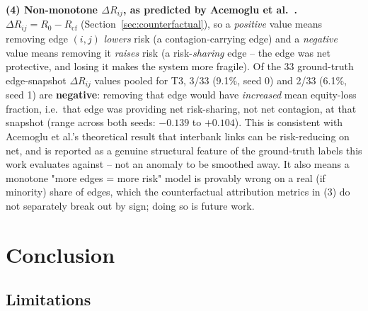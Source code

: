 \documentclass[journal]{IEEEtran}
\begin{document}
\textbf{(4) Non-monotone $\Delta R_{ij}$, as predicted by Acemoglu et
al.\ \cite{acemoglu2015}.} $\Delta R_{ij} = R_0 - R_{\mathrm{cf}}$
(Section~\ref{sec:counterfactual}), so a \emph{positive} value means
removing edge $(i,j)$ \emph{lowers} risk (a contagion-carrying edge) and a
\emph{negative} value means removing it \emph{raises} risk (a
risk-\emph{sharing} edge -- the edge was net protective, and losing it
makes the system more fragile). Of the 33 ground-truth edge-snapshot
$\Delta R_{ij}$ values pooled for T3, 3/33 (9.1\%, seed 0) and 2/33
(6.1\%, seed 1) are \textbf{negative}: removing that edge would have
\emph{increased} mean equity-loss fraction, i.e.\ that edge was providing
net risk-sharing, not net contagion, at that snapshot (range across both
seeds: $-0.139$ to $+0.104$). This is consistent with Acemoglu et al.'s
theoretical result that interbank links can be risk-reducing on net, and
is reported as a genuine structural feature of the ground-truth labels
this work evaluates against -- not an anomaly to be smoothed away.
It also means a monotone "more edges = more risk" model is provably wrong
on a real (if minority) share of edges, which the counterfactual
attribution metrics in (3) do not separately break out by sign; doing so
is future work.

\section{Conclusion}

\subsection{Limitations}
\label{sec:limitations}
\end{document}

